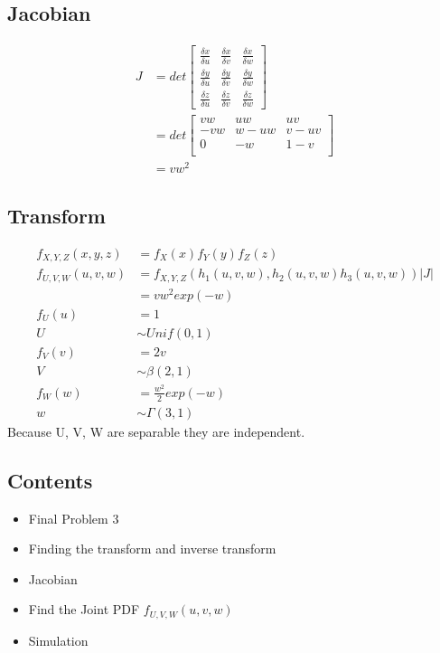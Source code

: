 \documentclass[12pt]{article}
\begin{document}
\subsection{Jacobian}
\begin{align*}
  J &= det\begin{bmatrix}
    \frac{\delta x}{\delta u} & \frac{\delta x}{\delta v} & \frac{\delta x}{\delta w} \\
    \frac{\delta y}{\delta u} & \frac{\delta y}{\delta v} & \frac{\delta y}{\delta w} \\
    \frac{\delta z}{\delta u} & \frac{\delta z}{\delta v} & \frac{\delta z}{\delta w}
  \end{bmatrix} \\
  &= det\begin{bmatrix}
    vw & uw & uv \\
    -vw & w-uw & v-uv \\
    0 & -w & 1-v \\
  \end{bmatrix} \\
  &= vw^2
\end{align*}

\subsection{Transform}
\begin{align*}
  f_{X,Y,Z}(x,y,z) &= f_X(x)f_Y(y)f_Z(z) \\
  f_{U,V,W}(u,v,w) &= f_{X,Y,Z}(h_1(u,v,w),h_2(u,v,w)h_3(u,v,w))|J| \\
  &= vw^2exp(-w) \\
  f_U(u) &= 1 \\
  U &\sim Unif(0,1) \\
  f_V(v) &= 2v \\
  V &\sim \beta(2,1) \\
  f_W(w) &= \frac{w^2}{2}exp(-w) \\
  w &\sim \Gamma(3,1)
\end{align*}
Because U, V, W are separable they are independent.

\subsection*{Contents}

\begin{itemize}
\setlength{\itemsep}{-1ex}
   \item Final Problem 3
   \item Finding the transform and inverse transform
   \item Jacobian
   \item Find the Joint PDF $f_{U,V,W}(u,v,w)$
   \item Simulation
\end{itemize}
\end{document}
